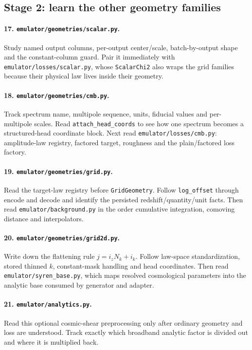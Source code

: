 \documentclass[10pt,aps,prd,twocolumn,nofootinbib]{revtex4-2}
\newcommand{\code}[1]{\texttt{#1}}
\begin{document}
\subsection{Stage 2: learn the other geometry families}

\paragraph{17.  \code{emulator/geometries/scalar.py}.}
Study named output columns, per-output center/scale, batch-by-output shape and
the constant-column guard.  Pair it immediately with
\code{emulator/losses/scalar.py}, whose \code{ScalarChi2} also wraps the grid
families because their physical law lives inside their geometry.

\paragraph{18.  \code{emulator/geometries/cmb.py}.}
Track spectrum name, multipole sequence, units, fiducial values and
per-multipole scales.  Read \code{attach\_head\_coords} to see how one spectrum
becomes a structured-head coordinate block.  Next read
\code{emulator/losses/cmb.py}: amplitude-law registry, factored target,
roughness and the plain/factored loss factory.

\paragraph{19.  \code{emulator/geometries/grid.py}.}
Read the target-law registry before \code{GridGeometry}.  Follow
\code{log\_offset} through encode and decode and identify the persisted
redshift/quantity/unit facts.  Then read \code{emulator/background.py} in the
order cumulative integration, comoving distance and interpolators.

\paragraph{20.  \code{emulator/geometries/grid2d.py}.}
Write down the flattening rule \(j=i_zN_k+i_k\).  Follow law-space
standardization, stored thinned \(k\), constant-mask handling and head
coordinates.  Then read \code{emulator/syren\_base.py}, which maps resolved
cosmological parameters into the analytic base consumed by generator and
adapter.

\paragraph{21.  \code{emulator/analytics.py}.}
Read this optional cosmic-shear preprocessing only after ordinary geometry and
loss are understood.  Track exactly which broadband analytic factor is divided
out and where it is multiplied back.
\end{document}
